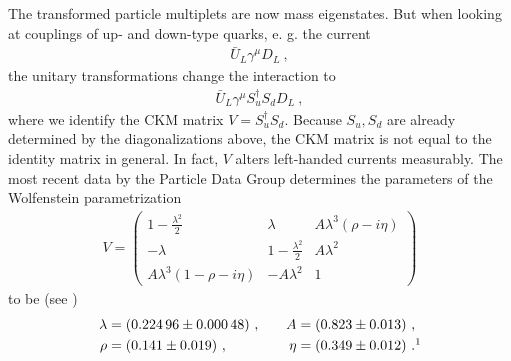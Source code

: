 The transformed particle multiplets are now mass eigenstates. But when looking at couplings of up- and down-type quarks, e. g. the current
\begin{align}
	\bar{U}_L\gamma^\mu D_L \ ,
\end{align}
the unitary transformations change the interaction to
\begin{align}
	\bar{U}_L\gamma^\mu S_u^\dagger S_d D_L \ ,
\end{align}
where we identify the CKM matrix $V=S_u^\dagger S_d$. Because $S_u,S_d$ are already determined by the diagonalizations above, the CKM matrix is not equal to the identity matrix in general. In fact, $V$ alters left-handed currents measurably. The most recent data by the Particle Data Group determines the parameters of the Wolfenstein parametrization
\begin{align}
	V = \begin{pmatrix}
	1-\frac{\lambda^2}{2} & \lambda & A\lambda^3(\rho-i\eta) \\
	-\lambda & 1-\frac{\lambda^2}{2} & A\lambda^2 \\
	A\lambda^3(1-\rho-i\eta) & -A\lambda^2 & 1
	\end{pmatrix}
\end{align}
to be (see \cite[Chapter 12]{PDG})
\begin{align}\label{eq:Wolf}
	\lambda &= \SI{0.22496(48)}{} \ , && &A &= \SI{0.823(13)}{} \ , \notag \\
	\rho &= \SI{0.141(19)}{} \ , && &\eta &= \SI{0.349(12)}{} \ .\footnotemark
\end{align}

